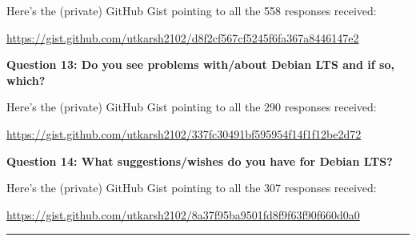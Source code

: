 \documentclass{article}
\begin{document}
\vspace{3mm}
\large Here's the (private) GitHub Gist pointing to all the 558 responses received:

\vspace{2mm}
\href{https://gist.github.com/utkarsh2102/d8f2cf567cf5245f6fa367a8446147e2}{https://gist.github.com/utkarsh2102/d8f2cf567cf5245f6fa367a8446147e2}

\vspace{20mm}
\large{\textbf{Question 13: Do you see problems with/about Debian LTS and if so, which?}}

\vspace{3mm}
\large Here's the (private) GitHub Gist pointing to all the 290 responses received:

\vspace{2mm}
\href{https://gist.github.com/utkarsh2102/337fc30491bf595954f14f1f12be2d72}{https://gist.github.com/utkarsh2102/337fc30491bf595954f14f1f12be2d72}

\vspace{20mm}
\large{\textbf{Question 14: What suggestions/wishes do you have for Debian LTS?}}

\vspace{3mm}
\large Here's the (private) GitHub Gist pointing to all the 307 responses received:

\vspace{2mm}
\href{https://gist.github.com/utkarsh2102/8a37f95ba9501fd8f9f63f90f660d0a0}{https://gist.github.com/utkarsh2102/8a37f95ba9501fd8f9f63f90f660d0a0}

\vspace{20mm}
\noindent\rule{16.5cm}{0.4pt}
\end{document}
